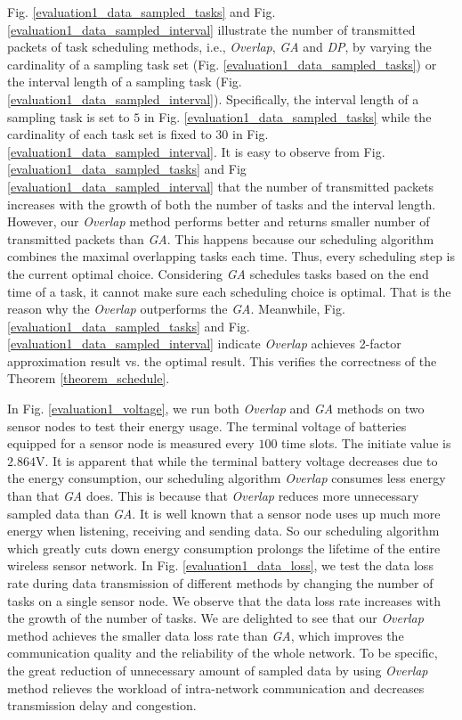 \documentclass[prodmode,acmtosn]{acmsmall}
\begin{document}
Fig. \ref{evaluation1_data_sampled_tasks} and Fig. \ref{evaluation1_data_sampled_interval} illustrate the number of transmitted packets of task scheduling methods, i.e., \emph{Overlap}, \emph{GA} and \emph{DP}, by varying the cardinality of a sampling task set (Fig. \ref{evaluation1_data_sampled_tasks}) or  the interval length of a sampling task (Fig. \ref{evaluation1_data_sampled_interval}). Specifically, the interval length of a sampling task is set to $5$ in Fig. \ref{evaluation1_data_sampled_tasks} while the cardinality of each task set is fixed to $30$ in Fig. \ref{evaluation1_data_sampled_interval}. It is easy to observe from Fig. \ref{evaluation1_data_sampled_tasks}  and Fig \ref{evaluation1_data_sampled_interval} that the number of transmitted packets increases with the  growth of both the number of tasks and the interval length. However, our \emph{Overlap} method performs better and returns smaller number of transmitted packets  than \emph{GA}. This happens because our scheduling algorithm combines the maximal overlapping tasks each time. Thus, every scheduling step is the current optimal choice. Considering \emph{GA} schedules tasks based on the end time of a task, it cannot make sure each scheduling choice is optimal. That is the reason why the \emph{Overlap} outperforms the \emph{GA}. Meanwhile, Fig. \ref{evaluation1_data_sampled_tasks} and Fig. \ref{evaluation1_data_sampled_interval} indicate \emph{Overlap} achieves 2-factor approximation result vs. the optimal result. This verifies the correctness of  the Theorem \ref{theorem_schedule}.

In Fig. \ref{evaluation1_voltage}, we run  both \emph{Overlap} and \emph{GA} methods on two sensor nodes to test their energy usage. The terminal voltage of batteries equipped for a sensor node is measured every $100$  time slots. The initiate value is $2.864$V. It is apparent that while the terminal battery voltage decreases due to the energy consumption, our scheduling algorithm \emph{Overlap}  consumes less energy  than that \emph{GA} does. This is because that \emph{Overlap} reduces more unnecessary sampled data than \emph{GA}. It is well known that a sensor node uses up much more energy when listening, receiving and sending data. So our scheduling algorithm which greatly cuts down  energy consumption prolongs the lifetime of the entire wireless sensor network. In Fig. \ref{evaluation1_data_loss}, we test the data loss rate during data transmission of different methods by  changing the number of tasks on a single sensor node. We observe  that the data loss rate increases with the growth of the number of tasks. We are delighted to see that our \emph{Overlap} method achieves the smaller data loss rate than \emph{GA}, which improves the communication quality and the reliability of the whole network. To be specific, the great reduction of unnecessary amount of sampled data by using \emph{Overlap} method relieves the workload of intra-network  communication and decreases transmission delay and congestion.
\end{document}
